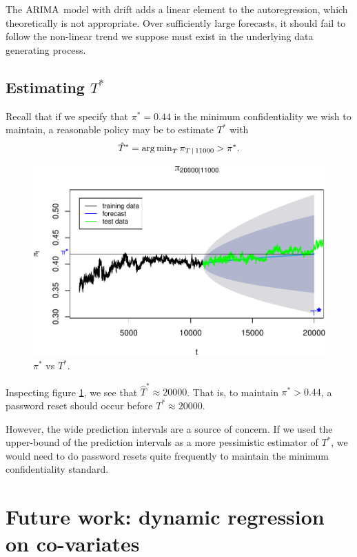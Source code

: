 \documentclass[final,
  11pt,
]{article}
\begin{document}
The \(\operatorname{ARIMA}\) model with drift adds a linear element to the
autoregression, which theoretically is not appropriate.
Over sufficiently large forecasts, it should fail to follow
the non-linear trend we suppose must exist in the underlying
data generating process.

\subsection{Estimating $T^*$}
Recall that if we specify that $\pi^* = 0.44$ is the minimum confidentiality
we wish to maintain, a reasonable policy may be to estimate $T^*$ with
$$
    \hat{T}^* = \operatorname{arg\,min}_{T} \pi_{T\,|\,11000} > \pi^*.
$$

\begin{figure}
    \includegraphics{Tstar.pdf}
    \caption{$\pi^*$ vs $T^*$.}
    \label{fig:tstar}%
\end{figure}

Inspecting figure \ref{fig:tstar}, we see that $\hat{T}^* \approx 20000$.
That is, to maintain $\pi^* > 0.44$, a password reset should occur
before $T^* \approx 20000$.

However, the wide prediction intervals are a source of concern.
If we used the upper-bound of the prediction intervals as a more pessimistic
estimator of $T^*$, we would need to do password resets quite frequently
to maintain the minimum confidentiality standard.

\hypertarget{future-work-dynamic-regression-on-co-variates}{%
\section{Future work: dynamic regression on
co-variates}\label{future-work-dynamic-regression-on-co-variates}}
\end{document}
